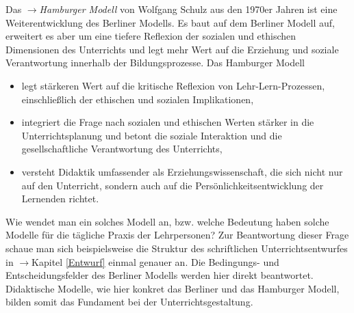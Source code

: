 Das $\to$\emph{Hamburger Modell} von Wolfgang Schulz aus den 1970er Jahren ist eine Weiterentwicklung des Berliner Modells. Es baut auf dem Berliner Modell auf, erweitert es aber um eine tiefere Reflexion der sozialen und ethischen Dimensionen des Unterrichts und legt mehr Wert auf die Erziehung und soziale Verantwortung innerhalb der Bildungsprozesse. Das Hamburger Modell



\begin{itemize}

	\item  legt st\"{a}rkeren Wert auf die kritische Reflexion von Lehr-Lern-Prozessen, einschlie{\ss}lich der ethischen und sozialen Implikationen,

	\item integriert die Frage nach sozialen und ethischen Werten st\"{a}rker in die Unterrichtsplanung und betont die soziale Interaktion und die gesellschaftliche Verantwortung des Unterrichts,

	\item versteht Didaktik umfassender als Erziehungswissenschaft, die sich nicht nur auf den Unterricht, sondern auch auf die Pers\"{o}nlichkeitsentwicklung der Lernenden richtet.

\end{itemize}



Wie wendet man ein solches Modell an, bzw. welche Bedeutung haben solche Modelle f\"{u}r die t\"{a}gliche Praxis der Lehrpersonen? Zur Beantwortung dieser Frage schaue man sich beispielsweise die Struktur des schriftlichen Unterrichtsentwurfes in $\to$Kapitel \ref{Entwurf} einmal genauer an. Die Bedingungs- und Entscheidungsfelder des Berliner Modells werden hier direkt beantwortet. Didaktische Modelle, wie hier konkret das Berliner und das Hamburger Modell, bilden somit das Fundament bei der Unterrichtsgestaltung.





